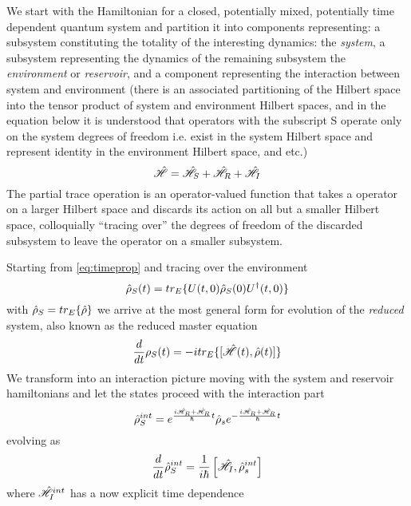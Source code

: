 We start with the Hamiltonian for a closed, potentially mixed, potentially time dependent quantum system and partition it into components representing: a subsystem constituting the totality of the interesting dynamics: the \emph{system}, a subsystem representing the dynamics of the remaining subsystem the \emph{environment} or \emph{reservoir}, and a component representing the interaction between system and environment (there is an associated partitioning of the Hilbert space into the tensor product of system and environment Hilbert spaces, and in the equation below it is understood that operators with the subscript S operate only on the system degrees of freedom i.e. exist in the system Hilbert space and represent identity in the environment Hilbert space, and etc.)
\begin{equation}
	\hat{\mathscr{H}} = \hat{\mathscr{H}}_S +\hat{\mathscr{H}}_R + \hat{\mathscr{H}}_I
\end{equation}
The partial trace operation is an operator-valued function that takes a operator on a larger Hilbert space and discards its action on all but a smaller Hilbert space, colloquially ``tracing over'' the degrees of freedom of the discarded subsystem to leave the operator on a smaller subsystem.

Starting from \ref{eq:timeprop} and tracing over the environment
\begin{equation}
	\hat{\rho}_S (t) = tr_E \{U(t, 0) \hat{\rho}_S (0) U^\dagger (t, 0) \}
\end{equation}
with $\hat{\rho}_S = tr_E\{\hat{\rho} \}$ we arrive at the most general form for evolution of the \emph{reduced} system, also known as the reduced master equation
\begin{equation}
	\frac{d}{dt} \rho_S (t) = -itr_E\{[\hat{\mathscr{H}}(t), \hat{\rho}(t)]\}
\end{equation}
We transform into an interaction picture moving with the system and reservoir hamiltonians and let the states proceed with the interaction part
\begin{equation}
	\hat{\rho}_S^{int} = e^{\frac{i\hat{\mathscr{H}}_R+\hat{\mathscr{H}}_R}{\hbar}t}\hat{\rho}_se^{-{\frac{i\hat{\mathscr{H}}_R+\hat{\mathscr{H}}_R}{\hbar}t}}
	\label{eq:densintdef}
\end{equation}
evolving as
\begin{equation}
	\frac{d}{dt}\hat{\rho}_S^{int} = \frac{1}{i\hbar}\left[\hat{\mathscr{H}}_{I}, \hat{\rho}_s^{int}\right]
\end{equation}
where $\hat{\mathscr{H}}_I^{int}$ has a now explicit time dependence
